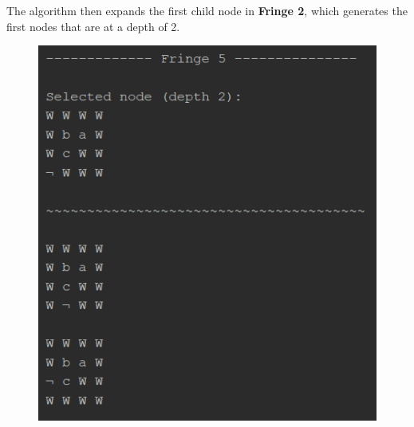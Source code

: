 \documentclass{article}
\begin{document}
	The algorithm then expands the first child node in \textbf{Fringe 2}, which generates the first nodes that are at a depth of 2.
	\begin{figure}[h]
		\centering
		\includegraphics{BFS-1-3.png}
	\end{figure}
\end{document}
